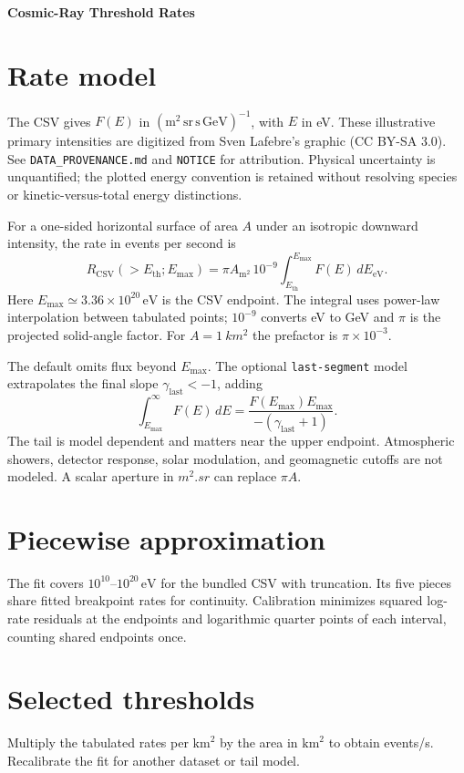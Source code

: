 \documentclass[11pt]{article}
\begin{document}
\begin{center}
\Large\bfseries Cosmic-Ray Threshold Rates
\end{center}

\section*{Rate model}

The CSV gives $F(E)$ in $(\mathrm{m}^2\,\mathrm{sr}\,\mathrm{s}\,\mathrm{GeV})^{-1}$,
with $E$ in eV. These illustrative primary intensities are digitized from
Sven Lafebre's graphic (CC BY-SA 3.0). See \texttt{DATA\_PROVENANCE.md} and
\texttt{NOTICE} for attribution. Physical uncertainty is unquantified;
the plotted energy convention is retained without resolving species or
kinetic-versus-total energy distinctions.

For a one-sided horizontal surface of area $A$ under an isotropic downward
intensity, the rate in events per second is
\[
R_{\mathrm{CSV}}(>E_{\mathrm{th}};E_{\max})
=
\pi A_{\mathrm{m}^2}\,10^{-9}
\int_{E_{\mathrm{th}}}^{E_{\max}} F(E)\,dE_{\mathrm{eV}} .
\]
Here $E_{\max}\simeq3.36\times10^{20}\,\mathrm{eV}$ is the CSV endpoint.
The integral uses power-law interpolation between tabulated points;
$10^{-9}$ converts eV to GeV and $\pi$ is the projected solid-angle factor.
For $A=\SI{1}{km^2}$ the prefactor is $\pi\times10^{-3}$.

The default omits flux beyond $E_{\max}$. The optional \texttt{last-segment}
model extrapolates the final slope $\gamma_{\mathrm{last}}<-1$, adding
\[
\int_{E_{\max}}^{\infty} F(E)\,dE
=
\frac{F(E_{\max})E_{\max}}{-\left(\gamma_{\mathrm{last}}+1\right)} .
\]
The tail is model dependent and matters near the upper endpoint.
Atmospheric showers, detector response, solar modulation, and geomagnetic
cutoffs are not modeled. A scalar aperture in $\si{m^2.sr}$ can replace $\pi A$.

\section*{Piecewise approximation}

The fit covers $10^{10}$--$10^{20}\,\mathrm{eV}$ for the bundled CSV with
truncation. Its five pieces share fitted breakpoint rates for continuity.
Calibration minimizes squared log-rate residuals at the endpoints and logarithmic
quarter points of each interval, counting shared endpoints once.



\section*{Selected thresholds}



Multiply the tabulated rates per $\mathrm{km}^2$ by the area in $\mathrm{km}^2$
to obtain events/s.
Recalibrate the fit for another dataset or tail model.
\end{document}
